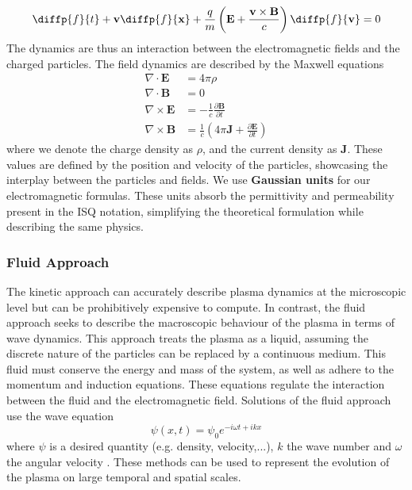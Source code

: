 \begin{equation}
\label{eq: vlasov}
\diffp{f}{t} + \textbf{v} \diffp{f}{{\textbf{x}}} + \frac{q}{m}\left( \textbf{E} + \frac{\textbf{v} \times \textbf{B}}{c}\right)\diffp{f}{{\textbf{v}}}= 0
\end{equation}
The dynamics are thus an interaction between the electromagnetic fields and the charged particles. The field dynamics are described by the Maxwell equations
\begin{align}
    \label{eq: gauss}
    \nabla \cdot \mathbf{E} &= 4 \pi \rho \\
    \label{eq: gauss magnetic}
	\nabla \cdot \mathbf{B} &= 0 \\
 \label{eq: Faraday}
	\nabla \times \mathbf{E} &= -\frac{1}{c}\frac{\partial \mathbf{B}}{\partial t} \\
 \label{eq: Ampere}
	\nabla \times \mathbf{B} &= \frac{1}{c}\left(4\pi \mathbf{J} + \frac{\partial \mathbf{E}}{\partial t}\right)
\end{align}
where we denote the charge density as $\rho$, and the current density as $\textbf{J}$. These values are defined by the position and velocity of the particles, showcasing the interplay between the particles and fields. We use \textbf{Gaussian units} for our electromagnetic formulas. These units absorb the permittivity and permeability present in the ISQ notation, simplifying the theoretical formulation while describing the same physics. 

\subsubsection{Fluid Approach}
The kinetic approach can accurately describe plasma dynamics at the microscopic level but can be prohibitively expensive to compute. In contrast, the fluid approach seeks to describe the macroscopic behaviour of the plasma in terms of wave dynamics. This approach treats the plasma as a liquid, assuming the discrete nature of the particles can be replaced by a continuous medium. This fluid must conserve the energy and mass of the system, as well as adhere to the momentum and induction equations. These equations regulate the interaction between the fluid and the electromagnetic field. Solutions of the fluid approach use the wave equation
\[\psi(x,t) = \psi_0e^{-i\omega t + i k x}\] 
where $\psi$ is a desired quantity (e.g. density, velocity,...), $k$ the wave number and $\omega$ the angular velocity 
\cite{chen_introduction_1984, leveque_computational_1998}. These methods can be used to represent the evolution of the plasma on large temporal and spatial scales.

